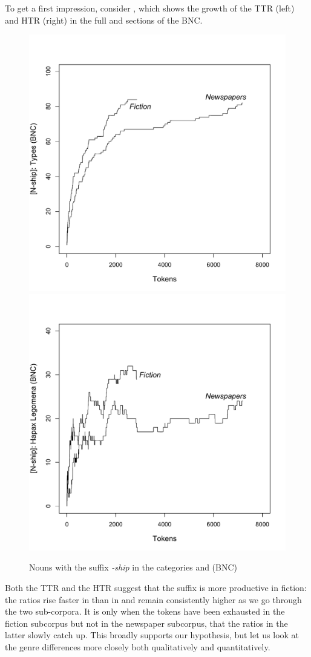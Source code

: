 To get a first impression, consider , which shows the growth of the TTR (left) and HTR  (right) in the full  and   sections of the  BNC.

\begin{figure}
\caption{Nouns with the suffix \textit{-ship} in the  categories  and  (BNC)\label{fig:genreshipfullttrhtr}}
\includegraphics[width=.5\linewidth,trim=0 0 0 50]{figures/genreshipfullttr}%
\includegraphics[width=.5\linewidth,trim=0 0 0 50]{figures/genreshipfullhtr}%
\end{figure}

Both the TTR  and the HTR  suggest that the suffix  is more productive  in fiction:  the ratios rise faster in  than in   and remain consistently higher as we go through the two sub\hyp{}corpora. It is only when the tokens have been exhausted in the fiction subcorpus but not in the newspaper subcorpus, that the ratios in the latter slowly catch up. This broadly supports our hypothesis, but let us look at the genre  differences more closely both qualitatively  and  quantitatively.


